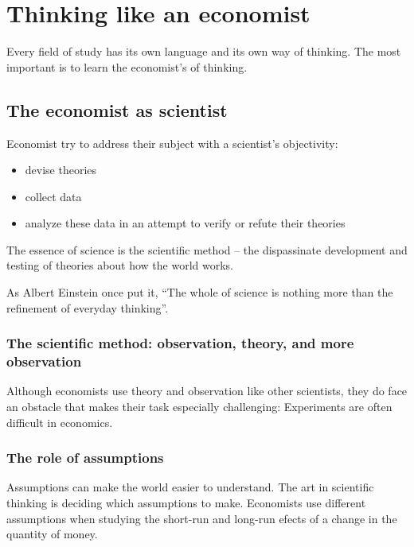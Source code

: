 
\chapter{Thinking like an economist}

Every field of study has its own language and its own way of thinking.
The most important is to learn the economist's of thinking.


\section{The economist as scientist}

Economist try to address their subject with a scientist's objectivity:
\begin{itemize}
\item devise theories
\item collect data
\item analyze these data in an attempt to verify or refute their theories
\end{itemize}

\begin{tcolorbox}
  The essence of science is the scientific method -- the dispassinate development and testing of theories about how the world works.
\end{tcolorbox}

As Albert Einstein once put it, ``The whole of science is nothing more than the refinement of everyday thinking''.


\subsection{The scientific method: observation, theory, and more observation}



Although economists use theory and observation like other scientists, they do face an obstacle that makes their task especially challenging: Experiments are often difficult in economics.

\subsection{The role of assumptions}

Assumptions can make the world easier to understand.
The art in scientific thinking is deciding which assumptions to make.
Economists use different assumptions when studying the short-run and long-run efects of a change in the quantity of money.

